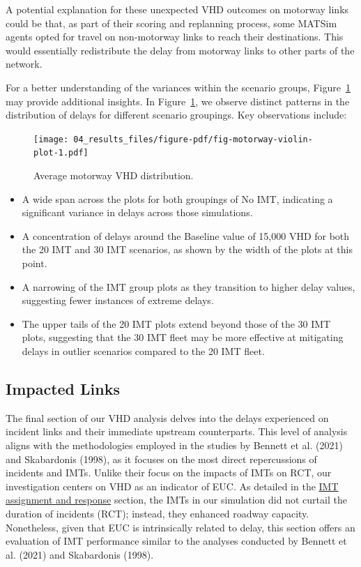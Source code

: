 \documentclass[fancy, oneside, mastersfancy, ms]{byuthesis}
\providecommand{\tightlist}{%
  \setlength{\itemsep}{0pt}\setlength{\parskip}{0pt}}\usepackage{longtable,booktabs,array}
\begin{document}
A potential explanation for these unexpected VHD outcomes on motorway
links could be that, as part of their scoring and replanning process,
some MATSim agents opted for travel on non-motorway links to reach their
destinations. This would essentially redistribute the delay from
motorway links to other parts of the network.

For a better understanding of the variances within the scenario groups,
Figure~\ref{fig-motorway-violin-plot} may provide additional insights.
In Figure~\ref{fig-motorway-violin-plot}, we observe distinct patterns
in the distribution of delays for different scenario groupings. Key
observations include:

\begin{figure}

{\centering \texttt{[image: 04\_results\_files/figure-pdf/fig-motorway-violin-plot-1.pdf]}

}

\caption{\label{fig-motorway-violin-plot}Average motorway VHD
distribution.}

\end{figure}

\begin{itemize}
\tightlist
\item
  A wide span across the plots for both groupings of No IMT, indicating
  a significant variance in delays across those simulations.
\item
  A concentration of delays around the Baseline value of 15,000 VHD for
  both the 20 IMT and 30 IMT scenarios, as shown by the width of the
  plots at this point.
\item
  A narrowing of the IMT group plots as they transition to higher delay
  values, suggesting fewer instances of extreme delays.
\item
  The upper tails of the 20 IMT plots extend beyond those of the 30 IMT
  plots, suggesting that the 30 IMT fleet may be more effective at
  mitigating delays in outlier scenarios compared to the 20 IMT fleet.
\end{itemize}

\hypertarget{sec-impacted}{%
\subsection{Impacted Links}\label{sec-impacted}}

The final section of our VHD analysis delves into the delays experienced
on incident links and their immediate upstream counterparts. This level
of analysis aligns with the methodologies employed in the studies by
Bennett et al. (2021) and Skabardonis (1998), as it focuses on the most
direct repercussions of incidents and IMTs. Unlike their focus on the
impacts of IMTs on RCT, our investigation centers on VHD as an indicator
of EUC. As detailed in the \protect\hyperlink{sec-imt_response}{IMT
assignment and response} section, the IMTs in our simulation did not
curtail the duration of incidents (RCT); instead, they enhanced roadway
capacity. Nonetheless, given that EUC is intrinsically related to delay,
this section offers an evaluation of IMT performance similar to the
analyses conducted by Bennett et al. (2021) and Skabardonis (1998).
\end{document}
